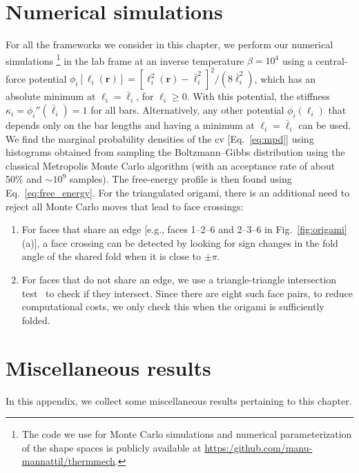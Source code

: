 \begin{subappendices}

\section{Numerical simulations}
\label{sec:numerics}

For all the frameworks we consider in this chapter, we perform our numerical simulations%
\footnote{The code we use for Monte Carlo simulations and numerical parameterization of the shape spaces is publicly available at \url{https:/github.com/manu-mannattil/thermmech}.}
in the lab frame at an inverse temperature $\beta = 10^{4}$ using a central-force potential $\phi_i[\ell_i(\bm{r})] = [\ell_i^{2}(\bm{r}) - \bar{\ell}_i^2]^2/(8\bar{\ell}_i^2)$, which has an absolute minimum at $\ell_i = \bar{\ell}_i$, for $\ell_i \geq 0$.
With this potential, the stiffness $\kappa_{i} = \phi_i''(\bar{\ell}_i) = 1$ for all bars.
Alternatively, any other potential $\phi_{i}(\ell_{i})$ that depends only on the bar lengths and having a minimum at $\ell_{i} = \bar{\ell}_{i}$ can be used.
We find the marginal probability densities of the \ac{cv} [Eq.~\eqref{eq:mpd}] using histograms obtained from sampling the Boltzmann--Gibbs distribution using the classical Metropolis Monte Carlo algorithm (with an acceptance rate of about 50\% and $\sim 10^{9}$ samples).
The free-energy profile is then found using Eq.~\eqref{eq:free_energy}.
For the triangulated origami, there is an additional need to reject all Monte Carlo moves that lead to face crossings:
%
\begin{enumerate}
  \item For faces that share an edge [e.g., faces 1--2--6 and 2--3--6 in Fig.~\ref{fig:origami}(a)], a face crossing can be detected by looking for sign changes in the fold angle of the shared fold when it is close to $\pm \pi$.
  \item For faces that do not share an edge, we use a triangle-triangle intersection test~\cite{tropp2006} to check if they intersect.
    Since there are eight such face pairs, to reduce computational costs, we only check this when the origami is sufficiently folded.
\end{enumerate}

\section{Miscellaneous results}

In this appendix, we collect some miscellaneous results pertaining to this chapter.


\end{subappendices}
